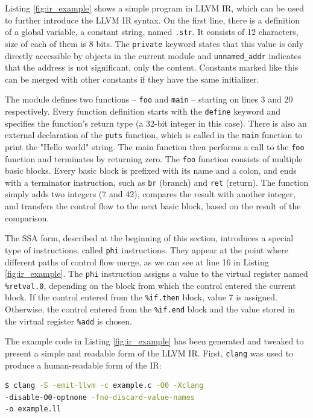 \documentclass[
  digital, %
  notable,   %
  twoside, %
  nolof,     %
  nolot,     %
]{fithesis3}
\theoremstyle{definition}
\begin{document}
Listing \ref{fig:ir_example} shows a simple program in LLVM IR, which can be used to further introduce the LLVM IR syntax. On the first line, there is a definition of a global variable, a constant string, named \texttt{.str}. It consists of 12 characters, size of each of them is 8 bits. The \texttt{private} keyword states that this value is only directly accessible by objects in the current module and \texttt{unnamed\_addr} indicates that the address is not significant, only the content. Constants marked like this can be merged with other constants if they have the same initializer. 


The module defines two functions -- \texttt{foo} and \texttt{main} -- starting on lines 3 and 20 respectively. Every function definition starts with the \texttt{define} keyword and specifies the function's return type (a 32-bit integer in this case). There is also an external declaration of the \texttt{puts} function, which is called in the \texttt{main} function to print the "Hello world" string. The main function then performs a call to the \texttt{foo} function and terminates by returning zero. The \texttt{foo} function consists of multiple basic blocks. Every basic block is prefixed with its name and a colon, and ends with a terminator instruction, such as \texttt{br} (branch) and \texttt{ret} (return). The function simply adds two integers (7 and 42), compares the result with another integer, and transfers the control flow to the next basic block, based on the result of the comparison. 

The SSA form, described at the beginning of this section, introduces a special type of instructions, called \texttt{phi} instructions. They appear at the point where different paths of control flow merge, as we can see at line 16 in Listing \ref{fig:ir_example}. The \texttt{phi} instruction assigns a value to the virtual register named \texttt{\%retval.0}, depending on the block from which the control entered the current block. If the control entered from the \texttt{\%if.then} block, value 7 is assigned. Otherwise, the control entered from the \texttt{\%if.end} block and the value stored in the virtual register \texttt{\%add} is chosen. 

The example code in Listing \ref{fig:ir_example} has been generated and tweaked to present a simple and readable form of the LLVM IR. First, \texttt{clang} was used to produce a human-readable form of the IR:

\begin{lstlisting}[language=bash]
$ clang -S -emit-llvm -c example.c -O0 -Xclang  
-disable-O0-optnone -fno-discard-value-names 
-o example.ll
\end{lstlisting}
\end{document}
